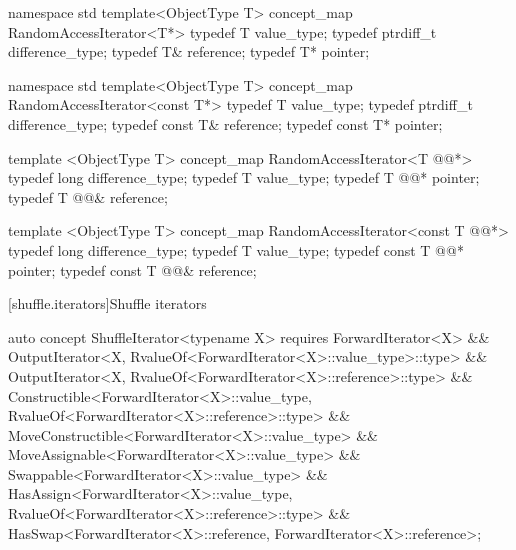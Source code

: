 \documentclass[american,twoside]{book}
\begin{document}
\pnum
{}

\begin{codeblock}
namespace std {
  template<ObjectType T> concept_map RandomAccessIterator<T*> {
    typedef T value_type;
    typedef ptrdiff_t difference_type;
    typedef T& reference;
    typedef T* pointer;
  }
}
\end{codeblock}


\begin{codeblock}
namespace std {
  template<ObjectType T> concept_map RandomAccessIterator<const T*> {
    typedef T value_type;
    typedef ptrdiff_t difference_type;
    typedef const T& reference;
    typedef const T* pointer;
  }
}
\end{codeblock}

\pnum
{}

\color{addclr}
\begin{codeblock}
  template <ObjectType T> concept_map RandomAccessIterator<T @@*> {
    typedef long difference_type;
    typedef T value_type;
    typedef T @@* pointer;
    typedef T @@& reference;
  }

  template <ObjectType T> concept_map RandomAccessIterator<const T @@*> {
    typedef long difference_type;
    typedef T value_type;
    typedef const T @@* pointer;
    typedef const T @@& reference;
  }
\end{codeblock}
\textcolor{addclr}{\exitnote}
\color{black}

[shuffle.iterators]{Shuffle iterators}
\pnum
{}

\color{addclr}
\begin{codeblock}
auto concept ShuffleIterator<typename X> {
  requires ForwardIterator<X>
        && OutputIterator<X, RvalueOf<ForwardIterator<X>::value_type>::type>
        && OutputIterator<X, RvalueOf<ForwardIterator<X>::reference>::type>
        && Constructible<ForwardIterator<X>::value_type, 
                         RvalueOf<ForwardIterator<X>::reference>::type>
        && MoveConstructible<ForwardIterator<X>::value_type>
        && MoveAssignable<ForwardIterator<X>::value_type>
        && Swappable<ForwardIterator<X>::value_type>
        && HasAssign<ForwardIterator<X>::value_type, 
                     RvalueOf<ForwardIterator<X>::reference>::type>
        && HasSwap<ForwardIterator<X>::reference, ForwardIterator<X>::reference>;
}
\end{codeblock}
\color{black}
\end{document}
